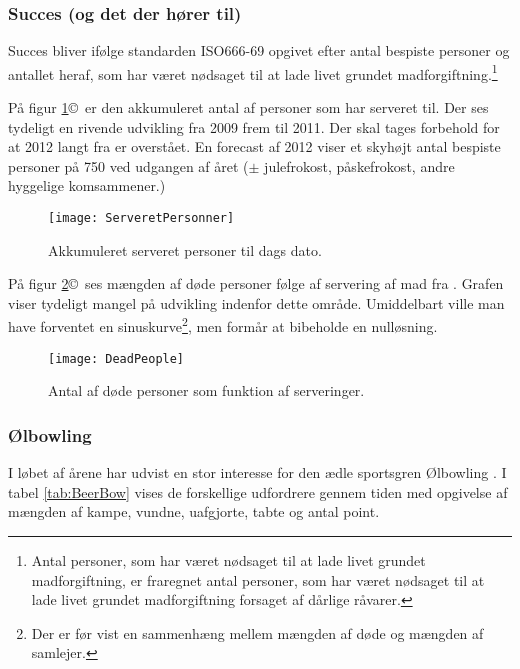\subsubsection{Succes (og det der hører til)}
Succes bliver ifølge standarden ISO666-69 opgivet efter antal bespiste personer og antallet heraf, som har været nødsaget til at lade livet grundet madforgiftning.\footnote{Antal personer, som har været nødsaget til at lade livet grundet madforgiftning, er fraregnet antal personer, som har været nødsaget til at lade livet grundet madforgiftning forsaget af dårlige råvarer. } 

På figur \ref{fig:ServeretPersonner}\copyright \,  er den akkumuleret antal af personer som \HM har serveret til. Der ses tydeligt en rivende udvikling fra 2009 frem til 2011. Der skal tages forbehold for at 2012 langt fra er overstået. En forecast af 2012 viser et skyhøjt antal bespiste personer på 750 ved udgangen af året ($\pm$ julefrokost, påskefrokost, andre hyggelige komsammener.)

\begin{figure}[h!]
\centering
\texttt{[image: ServeretPersonner]}
\caption{Akkumuleret serveret personer til dags dato.}
\label{fig:ServeretPersonner}
\end{figure}

På figur \ref{fig:DeadPeople}\copyright \, ses mængden af døde personer følge af servering af mad fra \HM. Grafen viser tydeligt mangel på udvikling indenfor dette område. Umiddelbart ville man have forventet en sinuskurve\footnote{Der er før vist en sammenhæng mellem mængden af døde og mængden af samlejer.}, men \HM formår at bibeholde en nulløsning. 

\begin{figure}[h!]
\centering
\texttt{[image: DeadPeople]}
\caption{Antal af døde personer som funktion af serveringer.}
\label{fig:DeadPeople}
\end{figure}

\subsubsection{Ølbowling}
I løbet af årene har \HM udvist en stor interesse for den ædle sportsgren Ølbowling \cite{bib:url:BeerBow}. I tabel \ref{tab:BeerBow} vises de forskellige udfordrere gennem tiden med opgivelse af mængden af kampe, vundne, uafgjorte, tabte og antal point. 

